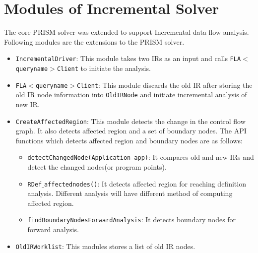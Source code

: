 \documentclass[11pt,a4paper,openright]{report}
\begin{document}
\section{Modules of Incremental Solver}
The core PRISM solver was extended to support Incremental data flow analysis. Following modules are the extensions to the PRISM solver.
\begin{itemize}
 \item \texttt{IncrementalDriver}: This module takes two IRs as an input and calls \texttt{FLA$<$queryname$>$Client} to initiate the analysis.
 \item \texttt{FLA$<$queryname$>$Client}: This module discards the old IR after storing the old IR node information into \texttt{OldIRNode}
 and initiate incremental analysis of new IR.
 \item \texttt{CreateAffectedRegion}: This module detects the change in the control flow graph. It also detects affected region and a set of boundary nodes.
 The API functions which detects affected region and boundary nodes are as follows:
 \begin{itemize}
  \item \texttt{detectChangedNode(Application app)}: It compares old and new IRs and detect the changed nodes(or program points).
  \item \texttt{RDef$\_$affectednodes()}: It detects affected region for reaching definition analysis. Different analysis will have different method of computing affected region. 
  \item \texttt{findBoundaryNodesForwardAnalysis}: It detects boundary nodes for forward analysis. 
   \end{itemize}
 \item \texttt{OldIRWorklist}: This modules stores a list of old IR nodes.
\end{itemize}

% 

\end{document}
